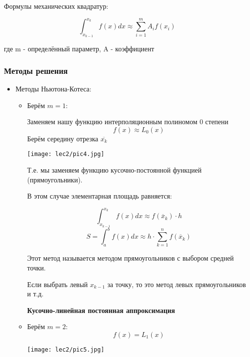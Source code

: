 \documentclass[12pt]{article}
\begin{document}
Формулы механических квадратур:

\[
  \int_{x_{k-1}}^{x_k} f(x)dx \approx \sum_{i=1}^m A_i f(x_i)
\] 

где m - определённый параметр,
A - коэффициент


\subsubsection{Методы решения}
\begin{itemize}
  \item Методы Ньютона-Котеса:
        \begin{itemize}
          \item Берём \( m=1 \):

                Заменяем нашу функцию интерполяционным полиномом 0 степени
                \[
                    f(x) \approx L_0(x)         
                \] 
                Берём середину отрезка \( \overline{x_k} \)

                \begin{center}
                  \texttt{[image: lec2/pic4.jpg]}
                \end{center}

                Т.е. мы заменяем функцию кусочно-постоянной функцией
                (прямоугольники).

                В этом случае элементарная площадь равняется:

                \[
                  \int_{x_{k-1}}^{x_k} f(x)dx \approx
                  f(\overline{x}_k) \cdot h
                \] 
                \[
                  S = \int_{a}^{b} f(x)dx \approx
                  h \cdot \sum_{k=1}^{n}f(\overline{x}_k)
                \] 

                Этот метод называется методом прямоугольников
                с выбором средней точки.  

                Если выбрать левый \( x_{k-1} \) за точку, то это метод
                левых прямоугольников и т.д.

                \textbf{Кусочно-линейная постоянная аппроксимация}
          \item Берём \( m=2 \):
            \[
              f(x) = L_1(x)
            \] 

            \begin{center}
              \texttt{[image: lec2/pic5.jpg]}
            \end{center}


\end{itemize}
\end{itemize}
\end{document}
